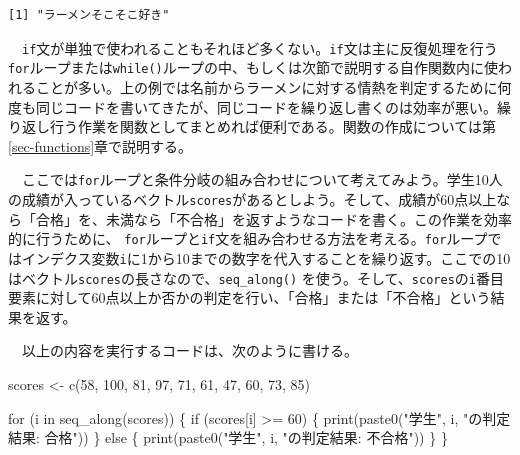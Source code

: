 \documentclass[
  a4paper,
  pandoc,
  ja=standard,
  jafont=haranoaji]{bxjsbook}
\newenvironment{Shaded}{\begin{snugshade}}{\end{snugshade}}
\newcommand{\ControlFlowTok}[1]{\textcolor[rgb]{0.00,0.48,0.65}{#1}}
\newcommand{\DecValTok}[1]{\textcolor[rgb]{0.68,0.00,0.00}{#1}}
\newcommand{\FunctionTok}[1]{\textcolor[rgb]{0.28,0.35,0.67}{#1}}
\newcommand{\NormalTok}[1]{\textcolor[rgb]{0.00,0.48,0.65}{#1}}
\newcommand{\OtherTok}[1]{\textcolor[rgb]{0.00,0.48,0.65}{#1}}
\newcommand{\SpecialCharTok}[1]{\textcolor[rgb]{0.37,0.37,0.37}{#1}}
\newcommand{\StringTok}[1]{\textcolor[rgb]{0.13,0.47,0.30}{#1}}
\begin{document}
\begin{verbatim}
[1] "ラーメンそこそこ好き"
\end{verbatim}

　\texttt{if}文が単独で使われることもそれほど多くない。\texttt{if}文は主に反復処理を行う\texttt{for}ループまたは\texttt{while()}ループの中、もしくは次節で説明する自作関数内に使われることが多い。上の例では名前からラーメンに対する情熱を判定するために何度も同じコードを書いてきたが、同じコードを繰り返し書くのは効率が悪い。繰り返し行う作業を関数としてまとめれば便利である。関数の作成については第\ref{sec-functions}章で説明する。

　ここでは\texttt{for}ループと条件分岐の組み合わせについて考えてみよう。学生10人の成績が入っているベクトル\texttt{scores}があるとしよう。そして、成績が60点以上なら「合格」を、未満なら「不合格」を返すようなコードを書く。この作業を効率的に行うために、
\texttt{for}ループと\texttt{if}文を組み合わせる方法を考える。\texttt{for}ループではインデクス変数\texttt{i}に1から10までの数字を代入することを繰り返す。ここでの10はベクトル\texttt{scores}の長さなので、\texttt{seq\_along()}
を使う。そして、\texttt{scores}の\texttt{i}番目要素に対して60点以上か否かの判定を行い、「合格」または「不合格」という結果を返す。

　以上の内容を実行するコードは、次のように書ける。

\begin{Shaded}
\begin{Highlighting}[numbers=left,,]
\NormalTok{scores }\OtherTok{\textless{}{-}} \FunctionTok{c}\NormalTok{(}\DecValTok{58}\NormalTok{, }\DecValTok{100}\NormalTok{, }\DecValTok{81}\NormalTok{, }\DecValTok{97}\NormalTok{, }\DecValTok{71}\NormalTok{, }\DecValTok{61}\NormalTok{, }\DecValTok{47}\NormalTok{, }\DecValTok{60}\NormalTok{, }\DecValTok{73}\NormalTok{, }\DecValTok{85}\NormalTok{)}

\ControlFlowTok{for}\NormalTok{ (i }\ControlFlowTok{in} \FunctionTok{seq\_along}\NormalTok{(scores)) \{}
  \ControlFlowTok{if}\NormalTok{ (scores[i] }\SpecialCharTok{\textgreater{}=} \DecValTok{60}\NormalTok{) \{}
    \FunctionTok{print}\NormalTok{(}\FunctionTok{paste0}\NormalTok{(}\StringTok{"学生"}\NormalTok{, i, }\StringTok{"の判定結果: 合格"}\NormalTok{))}
\NormalTok{  \} }\ControlFlowTok{else}\NormalTok{ \{}
    \FunctionTok{print}\NormalTok{(}\FunctionTok{paste0}\NormalTok{(}\StringTok{"学生"}\NormalTok{, i, }\StringTok{"の判定結果: 不合格"}\NormalTok{))}
\NormalTok{  \}}
\NormalTok{\}}
\end{Highlighting}
\end{Shaded}
\end{document}
